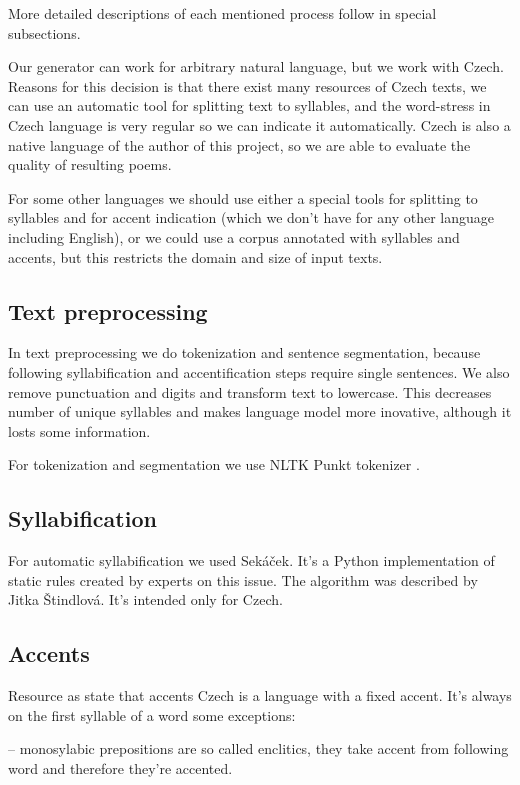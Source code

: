 \documentclass[a4]{article}
\begin{document}
More detailed descriptions of each mentioned process follow in special subsections.

Our generator can work for arbitrary natural language, but we work with
Czech. Reasons for this decision is that there exist many
resources of Czech texts, we can use an automatic tool for splitting text to syllables,
and the word-stress in Czech language is very regular so we can indicate
it automatically. Czech is also a native language of the author of this
project, so we are able to evaluate the quality of resulting poems. 

For some other languages we should use either a special tools for splitting
to syllables and for accent indication (which we don't have for any other
language including English),
or we could use a corpus annotated with syllables and accents, but this
restricts the domain and size of input texts.


\subsection{Text preprocessing}

In text preprocessing we do tokenization and sentence segmentation, because
following syllabification and accentification steps require single sentences. We also
remove punctuation and digits and transform text to lowercase. This decreases number of
unique syllables and makes language model more inovative, although it losts
some information.

For tokenization and segmentation we use NLTK Punkt tokenizer \cite{nltk}. %

\subsection{Syllabification}

For automatic syllabification we used Sekáček\cite{sekacek}.
It's a Python implementation of static rules created by experts on this
issue. The algorithm was described by Jitka Štindlová\cite{naserec}.
It's intended only for Czech.

\subsection{Accents}

Resource as\cite{prizvuk} state that accents Czech is a language with
a fixed accent. It's always on the first syllable of a word some exceptions: 

-- monosylabic prepositions are so called enclitics, they take accent from
following word and therefore they're accented. 
\end{document}
